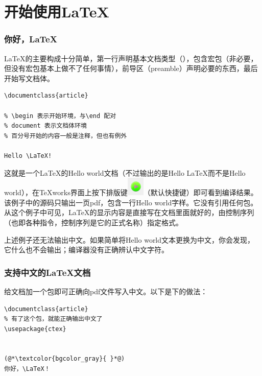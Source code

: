 
\part{开始使用\LaTeX}

\section{你好，\LaTeX}

\LaTeX 的主要构成十分简单，第一行声明基本文档类型（），包含宏包（非必要，但没有宏包基本上做不了任何事情），前导区（preamble）声明必要的东西，最后开始写文档体。

\begin{lstlisting}[style = LaTeX_TeXworks, caption = Hello \LaTeX]
\documentclass{article}

% \begin 表示开始环境，与\end 配对
% document 表示文档体环境
% 百分号开始的内容一般是注释，但也有例外

Hello \LaTeX!

\end{lstlisting}

这就是一个\LaTeX 的Hello world文档（不过输出的是Hello \LaTeX 而不是Hello world），在TeXworks界面上按下排版键\includegraphics{contents/assets/img/typeset_key.png}（默认快捷键）即可看到编译结果。该例子中的源码只输出一页pdf，包含一行Hello world字样。它没有引用任何包。从这个例子中可见，\LaTeX 的显示内容是直接写在文档里面就好的，由控制序列（也即各种指令，控制序列是它的正式名称）指定格式。

上述例子还无法输出中文。如果简单将Hello world文本更换为中文，你会发现，它什么也不会输出；编译器没有正确辨认中文字符。

\section{支持中文的\LaTeX 文档}

给文档加一个包即可正确向pdf文件写入中文。以下是\XeLaTeX 下的做法：

\begin{lstlisting}[style = LaTeX_TeXworks, caption = 你好，中文\LaTeX - \XeLaTeX]
\documentclass{article}
% 有了这个包，就能正确输出中文了
\usepackage{ctex}


(@*\textcolor{bgcolor_gray}{ }*@)
你好，\LaTeX！

\end{lstlisting}

